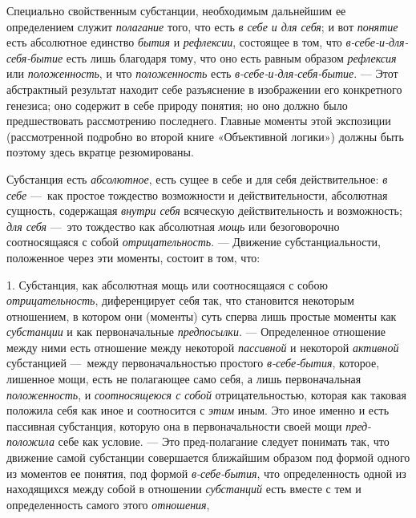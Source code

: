 \documentclass[twoside]{article}
\begin{document}
{Специально свойственным субстанции, необходимым дальнейшим ее определением 
служит {\em полагание} того, что есть {\em в себе и для себя}; и вот
{\em понятие} есть абсолютное единство {\em бытия} и {\em рефлексии},
состоящее в том, что {\em в-себе-и-для-себя-бытие} есть лишь благодаря тому, 
что оно есть равным образом {\em рефлексия} или {\em положенность}, и что
{\em положенность} есть {\em в-себе-и-для-себя-бытие}. — Этот абстрактный 
результат находит себе разъяснение в изображении его конкретного генезиса; 
оно содержит в себе природу понятия; но оно должно было предшествовать 
рассмотрению последнего. Главные моменты этой экспозиции (рассмотренной 
подробно во второй книге «Объективной логики») должны быть поэтому здесь 
вкратце резюмированы.

Субстанция есть {\em абсолютное}, есть сущее в себе и для себя 
действительное: {\em в себе} —~как простое тождество возможности и 
действительности, абсолютная сущность, содержащая {\em внутри себя}
всяческую действительность и возможность; {\em для себя} —~это
тождество как абсолютная {\em мощь} или безоговорочно соотносящаяся с собой
{\em отрицательность}. — Движение субстанциальности, положенное через эти 
моменты, состоит в том, что:

1. Субстанция, как абсолютная мощь или соотносящаяся с собою {\em отрицательность},
диференцирует себя так, что становится некоторым отношением,
в котором они (моменты) суть сперва лишь простые моменты как
{\em субстанции} и как первоначальные {\em предпосылки}. —
Определенное отношение между ними есть отношение между некоторой {\em пассивной}
и некоторой {\em активной} субстанцией —~между первоначальностью простого
{\em в-себе-бытия}, которое, лишенное мощи, есть не полагающее само себя, 
а лишь первоначальная {\em положенность}, и {\em соотносящеюся с собой} 
отрицательностью, которая как таковая положила себя как иное и соотносится с 
{\em этим} иным. Это иное именно и есть пассивная субстанция, которую она в 
первоначальности своей мощи {\em пред-положила} себе как условие. — Это 
пред-полагание следует понимать так, что движение самой субстанции 
совершается ближайшим образом под формой одного из моментов ее понятия, под 
формой {\em в-себе-бытия}, что определенность одной из находящихся между 
собой в отношении {\em субстанций} есть вместе с тем и определенность самого 
этого {\em отношения},

}
\end{document}

